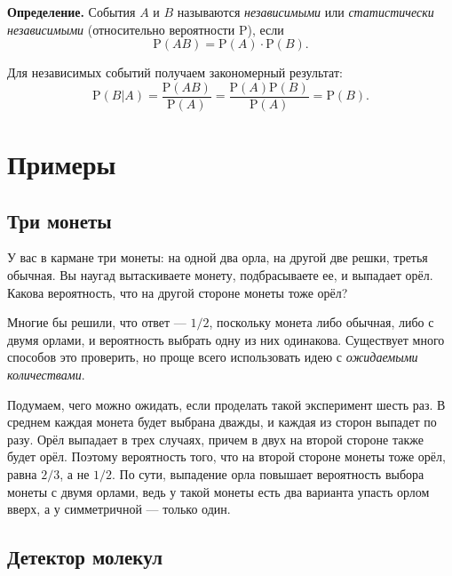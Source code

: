 \documentclass[11pt,a4paper]{article}
\begin{document}
\textbf{Определение.} События \(A\) и \(B\) называются
\emph{независимыми} или \emph{статистически независимыми} (относительно
вероятности \(\mathrm{P}\)), если
\[ \mathrm{P}(AB) = \mathrm{P}(A) \cdot \mathrm{P}(B). \]

Для независимых событий получаем закономерный результат:
\[ \mathrm{P}(B|A) = \dfrac{\mathrm{P}(AB)}{\mathrm{P}(A)} = \dfrac{\mathrm{P}(A)\mathrm{P}(B)}{\mathrm{P}(A)} = \mathrm{P}(B). \]

    \hypertarget{ux43fux440ux438ux43cux435ux440ux44b}{%
\section{Примеры}\label{ux43fux440ux438ux43cux435ux440ux44b}}

\hypertarget{ux442ux440ux438-ux43cux43eux43dux435ux442ux44b}{%
\subsection{Три
монеты}\label{ux442ux440ux438-ux43cux43eux43dux435ux442ux44b}}

У вас в кармане три монеты: на одной два орла, на другой две решки,
третья обычная. Вы наугад вытаскиваете монету, подбрасываете ее, и
выпадает орёл. Какова вероятность, что на другой стороне монеты тоже
орёл?

Многие бы решили, что ответ --- \(1/2\), поскольку монета либо обычная,
либо с двумя орлами, и вероятность выбрать одну из них одинакова.
Существует много способов это проверить, но проще всего использовать
идею с \emph{ожидаемыми количествами}.

Подумаем, чего можно ожидать, если проделать такой эксперимент шесть
раз. В среднем каждая монета будет выбрана дважды, и каждая из сторон
выпадет по разу. Орёл выпадает в трех случаях, причем в двух на второй
стороне также будет орёл. Поэтому вероятность того, что на второй
стороне монеты тоже орёл, равна \(2/3\), а не \(1/2\). По сути,
выпадение орла повышает вероятность выбора монеты с двумя орлами, ведь у
такой монеты есть два варианта упасть орлом вверх, а у симметричной ---
только один.


    \hypertarget{ux434ux435ux442ux435ux43aux442ux43eux440-ux43cux43eux43bux435ux43aux443ux43b}{%
\subsection{Детектор
молекул}\label{ux434ux435ux442ux435ux43aux442ux43eux440-ux43cux43eux43bux435ux43aux443ux43b}}
\end{document}
